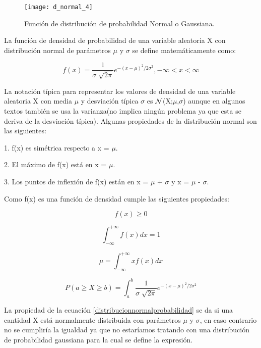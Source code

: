 \begin{figure}[H]
\centering
\texttt{[image: d\_normal\_4]}
\caption{Función de distribución de probabilidad Normal o Gaussiana.} \label{distribucionnormal_figura}
\end{figure}

La función de densidad de probabilidad de una variable aleatoria X con distribución normal de parámetros $\mu$ y $\sigma$ se define matemáticamente como:

\begin{equation}\label{distribucionnormal}
f(x) = \frac{1}{\sigma\sqrt[]{2\pi}}e^{-(x-\mu)^2/2\sigma^2} , -\infty < x < \infty
\end{equation}

La notación típica para representar los valores de densidad de una variable aleatoria X con media $\mu$ y desviación típica $\sigma$ es $\mathcal{N}$(X;$\mu$,$\sigma$) aunque en algunos textos también se usa la varianza(no implica ningún problema ya que esta se deriva de la desviación típica). Algunas propiedades de la distribución normal son las siguientes:


1. f(x) es simétrica respecto a x = $\mu$.

2. El máximo de f(x) está en x = $\mu$.

3. Los puntos de inflexión de f(x) están en x = $\mu$ + $\sigma$ y x = $\mu$ - $\sigma$.

Como f(x) es una función de densidad cumple las siguientes propiedades:

\begin{equation}\label{distribucionnormalmayorquecero}
f(x) \geq 0
\end{equation}

\begin{equation}\label{distribucionnormalintegral1}
\int_{-\infty}^{+\infty}f(x)dx = 1
\end{equation}

\begin{equation}\label{distribucionnormalmediaintegral}
\mu = \int_{-\infty}^{+\infty}xf(x)dx
\end{equation}

\begin{equation}\label{distribucionnormalprobabilidad}
P(a \geq X \geq b) = \int_{a}^{b}\frac{1}{\sigma\sqrt[]{2\pi}}e^{-(x-\mu)^2/2\sigma^2}
\end{equation}

La propiedad de la ecuación \ref{distribucionnormalprobabilidad} se da si una cantidad X está normalmente distribuida con parámetros $\mu$ y $\sigma$, en caso contrario no se cumpliría la igualdad ya que no estaríamos tratando con una distribución de probabilidad gaussiana para la cual se define la expresión.

